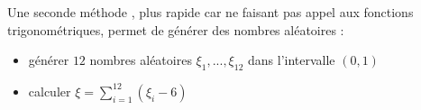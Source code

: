 \documentclass[12pt]{article}
\begin{document}
Une seconde méthode \cite{allentildesley}, plus rapide car ne faisant pas appel aux fonctions trigonométriques, permet de générer des nombres aléatoires :
\begin{itemize}
\item générer $12$ nombres aléatoires $\xi_1, ..., \xi_12$ dans l'intervalle $\left(0,1\right)$
\item calculer $\xi=\sum_{i=1}^12 \left(\xi_i-6\right)$
\end{itemize}

%
%
%
\end{document}
